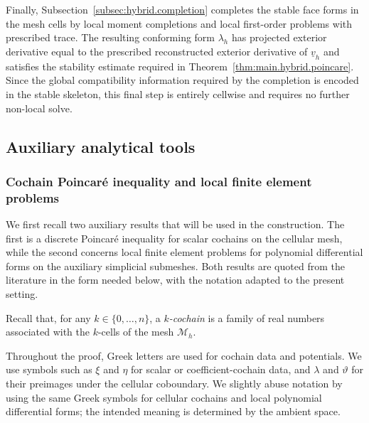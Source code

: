 \documentclass[a4paper,11pt]{article}
\theoremstyle{definition}
\newcommand{\Mh}{\mathcal{M}_h}
\begin{document}
Finally, Subsection~\ref{subsec:hybrid.completion} completes the stable face forms in the mesh cells by local moment completions and local first-order problems with prescribed trace.
The resulting conforming form $\lambda_h$ has projected exterior derivative equal to the prescribed reconstructed exterior derivative of $\underline v_h$ and satisfies the stability estimate required in Theorem~\ref{thm:main.hybrid.poincare}.
Since the global compatibility information required by the completion is encoded in the stable skeleton, this final step is entirely cellwise and requires no further non-local solve.

\subsection{Auxiliary analytical tools}
\label{subsec:auxiliary.tools}

\subsubsection{Cochain Poincar\'e inequality and local finite element problems}
\label{subsubsec:cochain.and.local.problems}

We first recall two auxiliary results that will be used in the construction.
The first is a discrete Poincar\'e inequality for scalar cochains on the cellular mesh, while the second concerns local finite element problems for polynomial differential forms on the auxiliary simplicial submeshes.
Both results are quoted from the literature in the form needed below, with the notation adapted to the present setting.

Recall that, for any $k\in\{0,\ldots,n\}$, a \emph{$k$-cochain} is a family of real numbers associated with the $k$-cells of the mesh $\Mh$.

Throughout the proof, Greek letters are used for cochain data and potentials.
We use symbols such as $\xi$ and $\eta$ for scalar or coefficient-cochain data, and $\lambda$ and $\vartheta$ for their preimages under the cellular coboundary.
We slightly abuse notation by using the same Greek symbols for cellular cochains and local polynomial differential forms; the intended meaning is determined by the ambient space.
\end{document}

